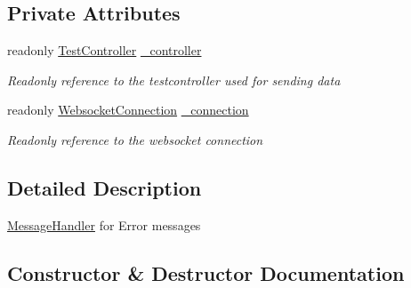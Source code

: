 \subsection*{Private Attributes}
\begin{DoxyCompactItemize}
\item 
readonly \hyperlink{class_web_analyzer_1_1_controller_1_1_test_controller}{Test\+Controller} \hyperlink{class_web_analyzer_1_1_server_1_1_message_handler_1_1_error_message_handler_acdb5ea45d9c1e9f90af483dd53176fe3}{\+\_\+controller}
\begin{DoxyCompactList}\small\item\em Readonly reference to the testcontroller used for sending data \end{DoxyCompactList}\item 
readonly \hyperlink{class_web_analyzer_1_1_server_1_1_websocket_connection}{Websocket\+Connection} \hyperlink{class_web_analyzer_1_1_server_1_1_message_handler_1_1_error_message_handler_afcc3d55e1eabc700cafcb9ce2d48106e}{\+\_\+connection}
\begin{DoxyCompactList}\small\item\em Readonly reference to the websocket connection \end{DoxyCompactList}\end{DoxyCompactItemize}


\subsection{Detailed Description}
\hyperlink{namespace_web_analyzer_1_1_server_1_1_message_handler}{Message\+Handler} for Error messages 



\subsection{Constructor \& Destructor Documentation}
\hypertarget{class_web_analyzer_1_1_server_1_1_message_handler_1_1_error_message_handler_a49c29974eceb3140f965c3688924e7c9}{}
